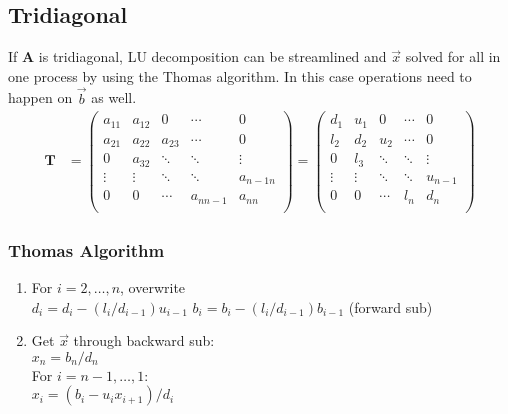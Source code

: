 \documentclass[12pt, answers]{exam}
\newcommand{\ve}[1]{\ensuremath{\mathbf{#1}}}
\begin{document}
\subsection*{Tridiagonal}
If $\ve{A}$ is tridiagonal, LU decomposition can be streamlined and $\vec{x}$ solved for all in one process by using the Thomas algorithm. In this case operations need to happen on $\vec{b}$ as well.
%
\begin{align}
    \ve{T} &= \begin{pmatrix}
      a_{11} & a_{12} & 0      & \cdots    & 0 \\
      a_{21} & a_{22} & a_{23} & \cdots    & 0 \\
      0      & a_{32} & \ddots & \ddots    & \vdots \\     
      \vdots & \vdots & \ddots & \ddots    & a_{n-1 n}\\
      0      & 0      & \cdots & a_{n n-1} & a_{nn} \\
    \end{pmatrix} =
    \begin{pmatrix}
      d_{1}  & u_{1}  & 0      & \cdots & 0 \\
      l_{2}  & d_{2}  & u_{2}  & \cdots & 0 \\
      0      & l_{3}  & \ddots & \ddots & \vdots \\     
      \vdots & \vdots & \ddots & \ddots & u_{n-1}\\
      0      & 0      & \cdots & l_{n}  & d_{n} \\
    \end{pmatrix} \nonumber   
\end{align} 

\subsubsection*{Thomas Algorithm}
\begin{enumerate}
\item For $i=2, \dots, n$, overwrite\\
  \hspace*{1 em} $d_i = d_i - (l_i / d_{i-1}) u_{i-1}$
  \hspace*{1 em} $b_i = b_i - (l_i / d_{i-1}) b_{i-1}$ (forward sub)

\item Get $\vec{x}$ through backward sub:\\
$x_n = b_n / d_n$\\
For $i = n-1, \dots, 1$:\\
  \hspace*{1 em} $x_i = (b_i - u_i x_{i+1}) / d_i$
\end{enumerate}



 
\end{document}
